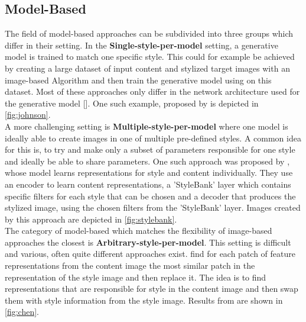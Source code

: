 \documentclass{seminar}
\begin{document}
	\subsection{Model-Based}
	The field of model-based approaches can be subdivided into three groups which differ in their setting. In the \textbf{Single-style-per-model} setting, a generative model is trained to match one specific style. This could for example be achieved by creating a large dataset of input content and stylized target images with an image-based Algorithm and then train the generative model using on this dataset. Most of these approaches only differ in the network architecture used for the generative model [\cite{jing2019neural}]. One such example, proposed by \cite{johnson2016perceptual} is depicted in \ref{fig:johnson}.\\
	A more challenging setting is \textbf{Multiple-style-per-model} where one model is ideally able to create images in one of multiple pre-defined styles. A common idea for this is, to try and make only a subset of parameters responsible for one style and ideally be able to share parameters. One such approach was proposed by \cite{chen2017stylebank}, whose model learns representations for style and content individually. They use an encoder to learn content representations, a 'StyleBank' layer which contains specific filters for each style that can be chosen and a decoder that produces the stylized image, using the chosen filters from the 'StyleBank' layer. Images created by this approach are depicted in \ref{fig:stylebank}.\\
	The category of model-based which matches the flexibility of image-based approaches the closest is \textbf{Arbitrary-style-per-model}. This setting is difficult and various, often quite different approaches exist. \cite{chen2016fast} find for each patch of feature representations from the content image the most similar patch in the representation of the style image and then replace it. The idea is to find representations that are responsible for style in the content image and then swap them with style information from the style image. Results from \cite{chen2016fast} are shown in \ref{fig:chen}.
	
	
	
\end{document}
